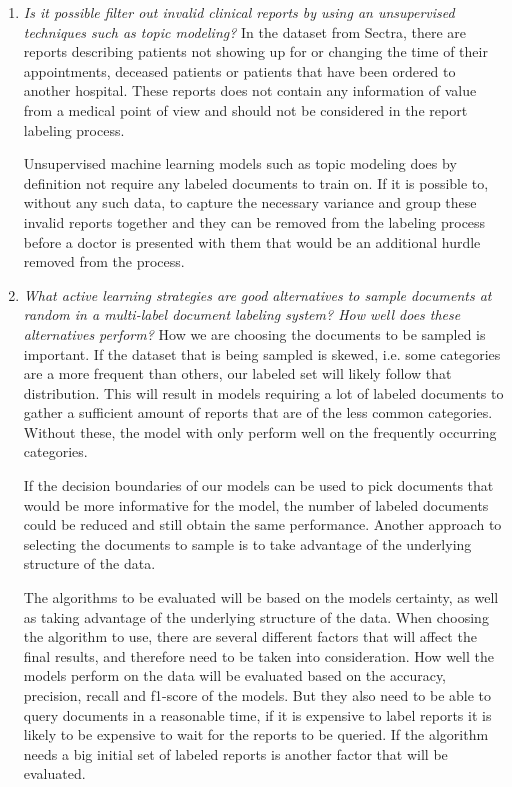 \begin{enumerate}

\item \textit{Is it possible filter out invalid clinical reports by using an unsupervised techniques such as topic modeling?}
      \newline
      In the dataset from Sectra, there are reports describing patients not showing up for or changing the time of their appointments, deceased patients or patients that have been ordered to another hospital.
      These reports does not contain any information of value from a medical point of view and should not be considered in the report labeling process.

      Unsupervised machine learning models such as topic modeling does by definition not require any labeled documents to train on.
      If it is possible to, without any such data, to capture the necessary variance and group these invalid reports together and they can be removed from the labeling process before a doctor is presented with them that would be an additional hurdle removed from the process.

\item \label{intro:re-q2} 
      \textit{What active learning strategies are good alternatives to sample documents at random in a multi-label document labeling system? How well does these alternatives perform?}
      \newline
      How we are choosing the documents to be sampled is important.
      If the dataset that is being sampled is skewed, i.e. some categories are a more frequent than others, our labeled set will likely follow that distribution.
      This will result in models requiring a lot of labeled documents to gather a sufficient amount of reports that are of the less common categories.
      Without these, the model with only perform well on the frequently occurring categories.

      If the decision boundaries of our models can be used to pick documents that would be more informative for the model, the number of labeled documents could be reduced and still obtain the same performance.
      Another approach to selecting the documents to sample is to take advantage of the underlying structure of the data.

      The algorithms to be evaluated will be based on the models certainty, as well as taking advantage of the underlying structure of the data.
      When choosing the algorithm to use, there are several different factors that will affect the final results, and therefore need to be taken into consideration.
      How well the models perform on the data will be evaluated based on the accuracy, precision, recall and f1-score of the models.
      But they also need to be able to query documents in a reasonable time, if it is expensive to label reports it is likely to be expensive to wait for the reports to be queried.
      If the algorithm needs a big initial set of labeled reports is another factor that will be evaluated.


\end{enumerate}
